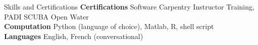 \documentclass{resume}
\begin{document}
\begin{rSection}{Skills and Certifications}
\textbf{Certifications} Software Carpentry Instructor Training, PADI SCUBA Open Water\\
\textbf{Computation} Python (language of choice), Matlab, R, shell script\\
\textbf{Languages} English, French (conversational)
\end{rSection}
\end{document}
